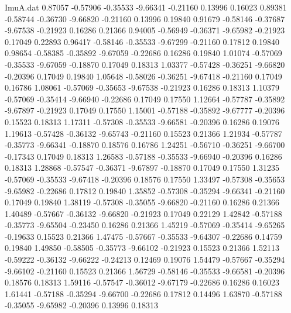 \begin{filecontents}{ImuA.dat}
   0.87057   -0.57906   -0.35533   -9.66341   -0.21160    0.13996    0.16023
   0.89381   -0.58744   -0.36730   -9.66820   -0.21160    0.13996    0.19840
   0.91679   -0.58146   -0.37687   -9.67538   -0.21923    0.16286    0.21366
   0.94005   -0.56949   -0.36371   -9.65982   -0.21923    0.17049    0.22893
   0.96417   -0.58146   -0.35533   -9.67299   -0.21160    0.17812    0.19840
   0.98654   -0.58385   -0.35892   -9.67059   -0.22686    0.16286    0.19840
   1.01074   -0.57069   -0.35533   -9.67059   -0.18870    0.17049    0.18313
   1.03377   -0.57428   -0.36251   -9.66820   -0.20396    0.17049    0.19840
   1.05648   -0.58026   -0.36251   -9.67418   -0.21160    0.17049    0.16786
   1.08061   -0.57069   -0.35653   -9.67538   -0.21923    0.16286    0.18313
   1.10379   -0.57069   -0.35414   -9.66940   -0.22686    0.17049    0.17550
   1.12664   -0.57787   -0.35892   -9.67897   -0.21923    0.17049    0.17550
   1.15001   -0.57188   -0.35892   -9.67777   -0.20396    0.15523    0.18313
   1.17311   -0.57308   -0.35533   -9.66581   -0.20396    0.16286    0.19076
   1.19613   -0.57428   -0.36132   -9.65743   -0.21160    0.15523    0.21366
   1.21934   -0.57787   -0.35773   -9.66341   -0.18870    0.18576    0.16786
   1.24251   -0.56710   -0.36251   -9.66700   -0.17343    0.17049    0.18313
   1.26583   -0.57188   -0.35533   -9.66940   -0.20396    0.16286    0.18313
   1.28868   -0.57547   -0.36371   -9.67897   -0.18870    0.17049    0.17550
   1.31235   -0.57069   -0.35533   -9.67418   -0.20396    0.18576    0.17550
   1.33497   -0.57308   -0.35653   -9.65982   -0.22686    0.17812    0.19840
   1.35852   -0.57308   -0.35294   -9.66341   -0.21160    0.17049    0.19840
   1.38119   -0.57308   -0.35055   -9.66820   -0.21160    0.16286    0.21366
   1.40489   -0.57667   -0.36132   -9.66820   -0.21923    0.17049    0.22129
   1.42842   -0.57188   -0.35773   -9.65504   -0.23450    0.16286    0.21366
   1.45219   -0.57069   -0.35414   -9.65265   -0.19633    0.15523    0.21366
   1.47475   -0.57667   -0.35533   -9.64307   -0.22686    0.14759    0.19840
   1.49850   -0.58505   -0.35773   -9.66102   -0.21923    0.15523    0.21366
   1.52113   -0.59222   -0.36132   -9.66222   -0.24213    0.12469    0.19076
   1.54479   -0.57667   -0.35294   -9.66102   -0.21160    0.15523    0.21366
   1.56729   -0.58146   -0.35533   -9.66581   -0.20396    0.18576    0.18313
   1.59116   -0.57547   -0.36012   -9.67179   -0.22686    0.16286    0.16023
   1.61441   -0.57188   -0.35294   -9.66700   -0.22686    0.17812    0.14496
   1.63870   -0.57188   -0.35055   -9.65982   -0.20396    0.13996    0.18313

\end{filecontents}
